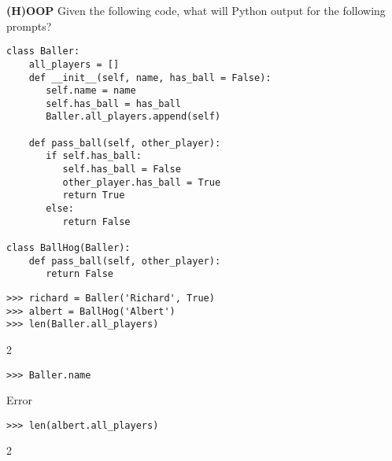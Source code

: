 \begin{blocksection}
\question \textbf{(H)OOP} \newline
Given the following code, what will Python output for the following prompts?

\begin{lstlisting}
class Baller:
    all_players = []
    def __init__(self, name, has_ball = False):
       self.name = name
       self.has_ball = has_ball
       Baller.all_players.append(self)

    def pass_ball(self, other_player):
       if self.has_ball:
          self.has_ball = False
          other_player.has_ball = True
          return True
       else:
          return False

class BallHog(Baller):
    def pass_ball(self, other_player):
       return False

\end{lstlisting}
\end{blocksection}
\newline
\newline
\newline
\begin{blocksection}

\begin{lstlisting}
>>> richard = Baller('Richard', True)
>>> albert = BallHog('Albert')
>>> len(Baller.all_players)
\end{lstlisting}
\begin{solution}[.2in]
2
\end{solution}

\begin{lstlisting}
>>> Baller.name
\end{lstlisting}
\begin{solution}[.2in]
Error
\end{solution}

\begin{lstlisting}
>>> len(albert.all_players)
\end{lstlisting}
\begin{solution}[.2in]
2
\end{solution}
\end{blocksection}

